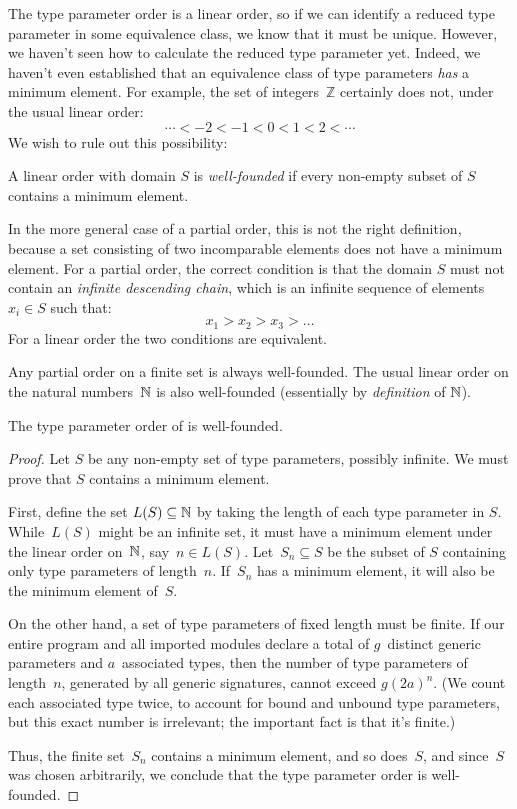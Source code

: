 \documentclass[../generics]{subfiles}
\begin{document}
The type parameter order is a linear order, so if we can identify a reduced type parameter in some equivalence class, we know that it must be unique. However, we haven't seen how to calculate the reduced type parameter yet. Indeed, we haven't even established that an equivalence class of type parameters \emph{has} a minimum element. For example, the set of integers~$\mathbb{Z}$ certainly does not, under the usual linear order:
\[\cdots < -2 < -1 < 0 < 1 < 2 < \cdots\]
We wish to rule out this possibility:
\begin{definition}\label{well founded def}
A linear order with domain $S$ is \emph{well-founded} if every non-empty subset of $S$ contains a minimum element.

In the more general case of a partial order, this is not the right definition, because a set consisting of two incomparable elements does not have a minimum element. For a partial order, the correct condition is that the domain $S$ must not contain an \emph{infinite descending chain}, which is an infinite sequence of elements $x_i\in S$ such that:
\[x_1 > x_2 > x_3 > \ldots \]
For a linear order the two conditions are equivalent.
\end{definition}

Any partial order on a finite set is always well-founded. The usual linear order on the natural numbers~$\mathbb{N}$ is also well-founded (essentially by \emph{definition} of $\mathbb{N}$).

\begin{proposition}\label{well founded type order} The type parameter order of  is well-founded.
\end{proposition}
\begin{proof}
Let $S$ be any non-empty set of type parameters, possibly infinite. We must prove that $S$ contains a minimum element.

First, define the set $L(S)\subseteq\mathbb{N}$ by taking the length of each type parameter in $S$. While~$L(S)$ might be an infinite set, it must have a minimum element under the linear order on~$\mathbb{N}$, say~$n\in L(S)$. Let~$S_n\subseteq S$ be the subset of $S$ containing only type parameters of length~$n$. If~$S_n$ has a minimum element, it will also be the minimum element of~$S$.

On the other hand, a set of type parameters of fixed length must be finite. If our entire program and all imported modules declare a total of $g$~distinct generic parameters and $a$~associated types, then the number of type parameters of length~$n$, generated by all generic signatures, cannot exceed $g(2a)^n$. (We count each associated type twice, to account for bound and unbound type parameters, but this exact number is irrelevant; the important fact is that it's finite.)

Thus, the finite set~$S_n$ contains a minimum element, and so does~$S$, and since~$S$ was chosen arbitrarily, we conclude that the type parameter order is well-founded.
\end{proof}
\end{document}
